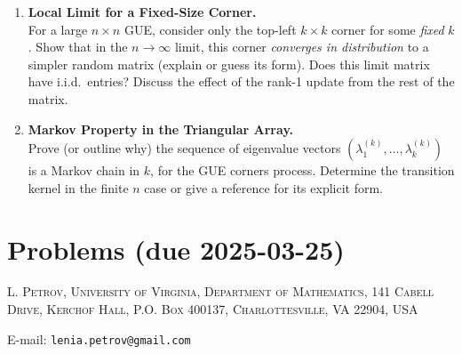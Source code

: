 \documentclass[letterpaper,11pt,oneside,reqno]{article}
\numberwithin{equation}{section}
\theoremstyle{definition}
\begin{document}
\begin{enumerate}
\item \textbf{Local Limit for a Fixed-Size Corner.} \\
For a large $n\times n$ GUE, consider only the top-left $k\times k$ corner for some \emph{fixed} $k$. Show that in the $n\to\infty$ limit, this corner \emph{converges in distribution} to a simpler random matrix (explain or guess its form). Does this limit matrix have i.i.d.\ entries? Discuss the effect of the rank-1 update from the rest of the matrix.
\medskip

\item \textbf{Markov Property in the Triangular Array.} \\
Prove (or outline why) the sequence of eigenvalue vectors $(\lambda_1^{(k)},\dots,\lambda_k^{(k)})$ is a Markov chain in $k$, for the GUE corners process. Determine the transition kernel in the finite $n$ case or give a reference for its explicit form.
\end{enumerate}





































\appendix
\setcounter{section}{6}

\section{Problems (due 2025-03-25)}









\medskip

\textsc{L. Petrov, University of Virginia, Department of Mathematics, 141 Cabell Drive, Kerchof Hall, P.O. Box 400137, Charlottesville, VA 22904, USA}

E-mail: \texttt{lenia.petrov@gmail.com}
\end{document}
